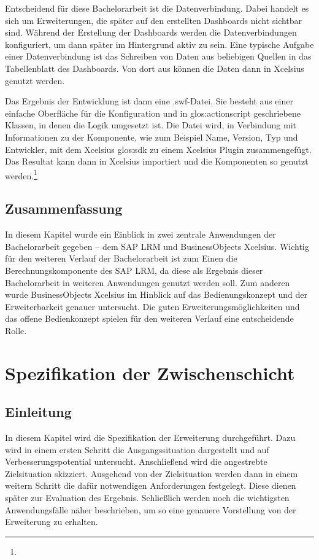 \begin{onehalfspacing}
Entscheidend für diese Bachelorarbeit ist die Datenverbindung. Dabei handelt es sich um Erweiterungen, die später auf den erstellten Dashboards nicht sichtbar sind. Während der Erstellung der Dashboards werden die Datenverbindungen konfiguriert, um dann später im Hintergrund aktiv zu sein. Eine typische Aufgabe einer Datenverbindung ist das Schreiben von Daten aus beliebigen Quellen in das Tabellenblatt des Dashboards. Von dort aus können die Daten dann in Xcelsius genutzt werden.

Das Ergebnis der Entwicklung ist dann eine .swf-Datei. Sie besteht aus einer einfache Oberfläche für die Konfiguration und in \gls{glos:actionscript} geschriebene Klassen, in denen die Logik umgesetzt ist. Die Datei wird, in Verbindung mit Informationen zu der Komponente, wie zum Beispiel Name, Version, Typ und Entwickler, mit dem \gls{Xcelsius} \gls{glos:sdk} zu einem \gls{Xcelsius} Plugin zusammengefügt. Das Resultat kann dann in \gls{Xcelsius} importiert und die Komponenten so genutzt werden.\footnote{ }

\section{Zusammenfassung}
In diesem Kapitel wurde ein Einblick in zwei zentrale Anwendungen der Bachelorarbeit gegeben -- dem SAP LRM und BusinessObjects Xcelsius. Wichtig für den weiteren Verlauf der Bachelorarbeit ist zum Einen die Berechnungskomponente des SAP LRM, da diese als Ergebnis dieser Bachelorarbeit in weiteren Anwendungen genutzt werden soll. Zum anderen wurde BusinessObjects Xcelsius im Hinblick auf das Bedienungskonzept und der Erweiterbarkeit genauer untersucht. Die guten Erweiterungsmöglichkeiten und das offene Bedienkonzept spielen für den weiteren Verlauf eine entscheidende Rolle.

\chapter{Spezifikation der Zwischenschicht}
\label{sec:spezifikation}

\section{Einleitung}
In diesem Kapitel wird die Spezifikation der Erweiterung durchgeführt. Dazu wird in einem ersten Schritt die Ausgangssituation dargestellt und auf Verbesserungspotential untersucht. Anschließend wird die angestrebte Zielsituation skizziert. Ausgehend von der Zielsituation werden dann in einem weitern Schritt die dafür notwendigen Anforderungen festgelegt. Diese dienen später zur Evaluation des Ergebnis. Schließlich werden noch die wichtigsten Anwendungsfälle näher beschrieben, um so eine genauere Vorstellung von der Erweiterung zu erhalten.


\end{onehalfspacing}
